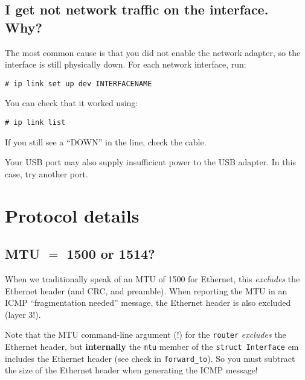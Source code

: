 \documentclass{article}
\begin{document}
\subsection{I get not network traffic on the interface. Why?}

The most common cause is that you did not enable the network adapter,
so the interface is still physically down. For each network interface,
run:
\begin{verbatim}
# ip link set up dev INTERFACENAME
\end{verbatim}
You can check that it worked using:
\begin{verbatim}
# ip link list
\end{verbatim}
If you still see a ``DOWN'' in the line, check the cable.

Your USB port may also supply insufficient power to the USB adapter.
In this case, try another port.


\section{Protocol details}

\subsection{MTU $=$ 1500 or 1514?}

When we traditionally speak of an MTU of 1500 for Ethernet, this
{\em excludes} the Ethernet header (and CRC, and preamble).  When
reporting the MTU in an ICMP ``fragmentation needed'' message,
the Ethernet header is also excluded (layer 3!).

Note that the MTU command-line argument (!) for the {\tt router} {\em
  excludes} the Ethernet header, but {\bf internally} the \texttt{mtu}
member of the {\tt struct Interface} {em includes} the Ethernet header
(see check in {\tt forward\_to}).  So you must subtract the size of
the Ethernet header when generating the ICMP message!
\end{document}
